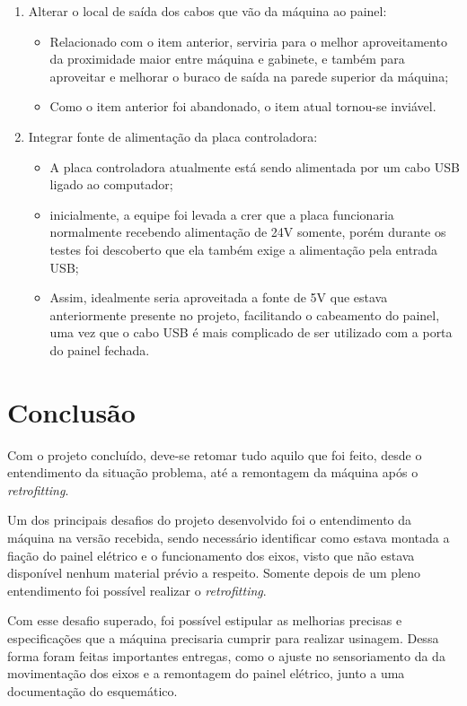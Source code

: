 \documentclass[
	article,			%
	11pt,				%
	oneside,			%
	a4paper,			%
	section=TITLE,		%
	english,			%
	brazil,				%
	sumario=tradicional
	]{abntex2}
\begin{document}
\begin{enumerate}
\begin{itemize}
    \end{itemize}
    \item Alterar o local de saída dos cabos que vão da máquina ao painel:
    \begin{itemize}
        \item Relacionado com o item anterior, serviria para o melhor aproveitamento da proximidade maior entre máquina e gabinete, e também para aproveitar e melhorar o buraco de saída na parede superior da máquina;
        \item Como o item anterior foi abandonado, o item atual tornou-se inviável.
    \end{itemize}
    \item Integrar fonte de alimentação da placa controladora: 
    \begin{itemize}
        \item A placa controladora atualmente está sendo alimentada por um cabo USB ligado ao computador;
        \item inicialmente, a equipe foi levada a crer que a placa funcionaria normalmente recebendo alimentação de 24V somente, porém durante os testes foi descoberto que ela também exige a alimentação pela entrada USB;
        \item Assim, idealmente seria aproveitada a fonte de 5V que estava anteriormente presente no projeto, facilitando o cabeamento do painel, uma vez que o cabo USB é mais complicado de ser utilizado com a porta do painel fechada.
    \end{itemize}
    
\end{enumerate}


\section{Conclusão}

Com o projeto concluído, deve-se retomar tudo aquilo que foi feito, desde o entendimento da situação problema, até a remontagem da máquina após o \textit{retrofitting}.

Um dos principais desafios do projeto desenvolvido foi o entendimento da máquina na versão recebida, sendo necessário identificar como estava montada a fiação do painel elétrico e o funcionamento dos eixos, visto que não estava disponível nenhum material prévio a respeito. Somente depois de um pleno entendimento foi possível realizar o \textit{retrofitting}.

Com esse desafio superado, foi possível estipular as melhorias precisas e especificações que a máquina precisaria cumprir para realizar usinagem. Dessa forma foram feitas importantes entregas, como o ajuste no sensoriamento da da movimentação dos eixos e a remontagem do painel elétrico, junto a uma documentação do esquemático.
\end{document}
